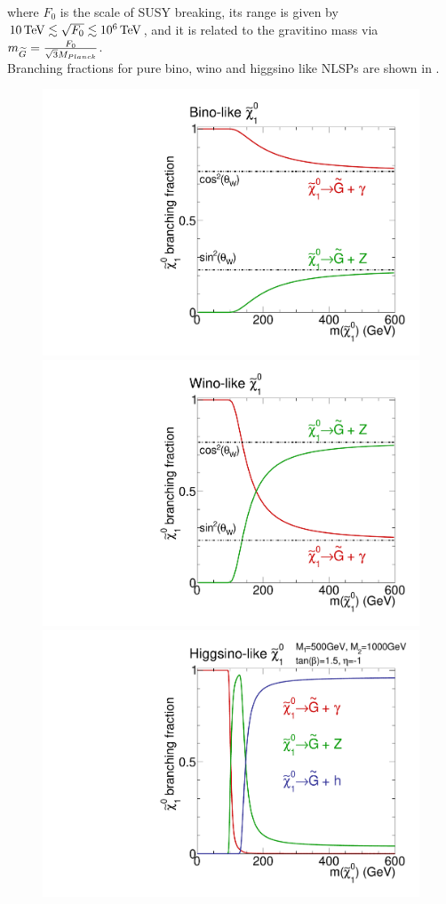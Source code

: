 where $F_0$ is the scale of SUSY breaking, its  range is given by $10\,\text{Te\hspace{-.08em}V}\lesssim\sqrt{F_0}\lesssim10^6\,\text{Te\hspace{-.08em}V}$, and it is related to the gravitino mass via $m_{\widetilde{G}}=\frac{F_0}{\sqrt{3}M_{Planck}}$.\\
Branching fractions for pure bino, wino and higgsino like NLSPs are shown in .
\begin{figure}[htb]
  \centering
    \includegraphics[width=\pairwidth]{figures/signal/binoBranching}
    \includegraphics[width=\pairwidth]{figures/signal/winoBranching}\\
    \includegraphics[width=\pairwidth]{figures/signal/higgsinoBranching1}

\end{figure}
